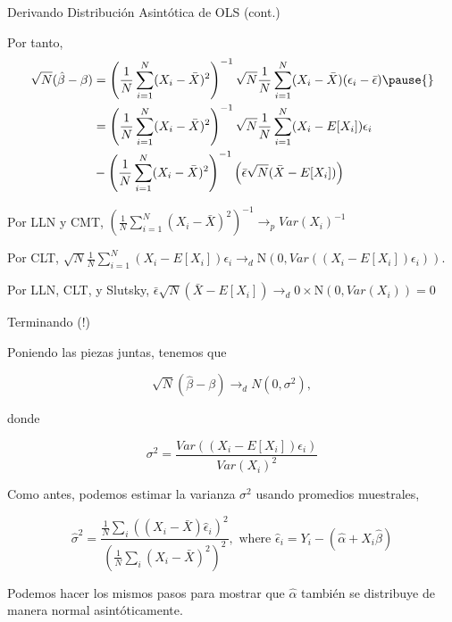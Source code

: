 \documentclass[11pt,handout,aspectratio=169]{beamer}
\newenvironment{wideitemize}{\itemize\addtolength{\itemsep}{10pt}}{\enditemize}
\begin{document}
\begin{frame}{Derivando Distribución Asintótica de OLS (cont.)}
\begin{wideitemize}
	\item	Por tanto,
	\begin{align*}
		\sqrt{N}(\hat\beta - \beta) &= \left( \frac{1}{N} \sum_{i=1}^N (X_i - \bar{X})^2 \right)^{-1}  \sqrt{N} \frac{1}{N} \sum_{i=1}^N (X_i - \bar{X})(\epsilon_i - \bar{\epsilon}) \pause{} \\
		&= \left( \frac{1}{N} \sum_{i=1}^N (X_i - \bar{X})^2 \right)^{-1} \sqrt{N}\frac{1}{N} \sum_{i=1}^N (X_i - E[X_i])\epsilon_i \\
		&-\left( \frac{1}{N} \sum_{i=1}^N (X_i - \bar{X})^2 \right)^{-1}  \left( \bar{\epsilon} \sqrt{N} (\bar{X} - E[X_i]) \right)
	\end{align*}

	\item
	Por LLN y CMT, $\left( \frac{1}{N} \sum_{i=1}^N (X_i - \bar{X})^2 \right)^{-1} \rightarrow_p Var(X_i)^{-1}$
	
	\pause
	\item
	Por CLT, $\sqrt{N}\frac{1}{N} \sum_{i=1}^N (X_i - E[X_i])\epsilon_i \rightarrow_d \mathrm{N}(0, Var((X_i - E[X_i])\epsilon_i)).$
	
	\pause
	\item
	Por LLN, CLT, y Slutsky,  $\bar{\epsilon} \sqrt{N} (\bar{X} - E[X_i]) \rightarrow_d 0 \times \mathrm{N}(0, Var(X_i))  = 0$
	
\end{wideitemize}

\end{frame}

\begin{frame}{Terminando (!)}
	
	\begin{wideitemize}
	\item
	Poniendo las piezas juntas, tenemos que
	
	$$\sqrt{N}(\hat\beta - \beta) \rightarrow_d N(0, \sigma^2),$$
	
	\noindent donde
	
	$$\sigma^2 = \dfrac{  Var((X_i - E[X_i])\epsilon_i) }{ Var(X_i)^2  }$$ 
	
	\item
	Como antes, podemos estimar la varianza $\sigma^2$ usando promedios muestrales,
	
	$$\hat\sigma^2 = \dfrac{  \frac{1}{N} \sum_i ((X_i - \bar{X})\hat\epsilon_i )^2}{ \left(\frac{1}{N} \sum_i (X_i - \bar{X})^2\right)^2  }, \text{ where } \hat\epsilon_i = Y_i - (\hat\alpha + X_i \hat\beta)$$ 
	
	
	\item
	\pause
	Podemos hacer los mismos pasos para mostrar que $\hat\alpha$ también se distribuye de manera normal asintóticamente. 
\end{wideitemize}	
\end{frame}
		
\end{document}
